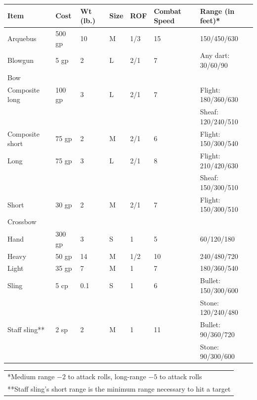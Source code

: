 \noindent
\begin{minipage}{\columnwidth}

\label{rangedweapons}
\noindent
\begin{tabular}{|p{}|p{}|p{}|p{}|p{}|p{}|p{}|}
\hline
Item				& Cost	& Wt (lb.)	& Size	& ROF	& Combat Speed	& Range (in feet)* \\
\hline\hline
\rowcolor[gray]{.9}Arquebus			& 500 gp	& 10		& M		& 1/3	& 15			& 150/450/630 \\
Blowgun				& 5 gp	& 2			& L		& 2/1	& 7				& Any dart: 30/60/90 \\
\rowcolor[gray]{.9}Bow					& 		& 			& 		& 		& 				& \\
\rowcolor[gray]{.9}\hspace{1em}Composite long 	& 100 gp	& 3			& L		& 2/1	& 7				& Flight: 180/360/630 \\
\rowcolor[gray]{.9}					& 		& 			& 		& 		& 				& Sheaf: 120/240/510 \\
\hspace{1em}Composite short	& 75 gp	& 2			& M		& 2/1	& 6				& Flight: 150/300/540 \\
\rowcolor[gray]{.9}\hspace{1em}Long				& 75 gp	& 3			& L		& 2/1	& 8				& Flight: 210/420/630 \\
\rowcolor[gray]{.9}					& 		& 			& 		& 		& 				& Sheaf: 150/300/510 \\
\hspace{1em}Short				& 30 gp	& 2			& M		& 2/1	& 7				& Flight: 150/300/510 \\
\rowcolor[gray]{.9}Crossbow			& 		& 			& 		& 		& 				& \\
\rowcolor[gray]{.9}\hspace{1em}Hand				& 300 gp	& 3			& S		& 1		&5				& 60/120/180 \\
\hspace{1em}Heavy				& 50 gp	& 14		& M		& 1/2	& 10			& 240/480/720 \\
\rowcolor[gray]{.9}\hspace{1em}Light				& 35 gp	& 7			& M		& 1		& 7				& 180/360/540 \\
Sling				& 5 cp	& 0.1		& S		& 1		& 6				& Bullet: 150/300/600 \\
					& 		& 			& 		& 		& 				& Stone: 120/240/480 \\
\rowcolor[gray]{.9}Staff sling**		& 2 sp	& 2			& M		& 1		& 11			& Bullet: 90/360/720 \\
\rowcolor[gray]{.9}					& 		& 			& 		& 		& 				& Stone: 90/300/600 \\
\hline
\end{tabular}
\noindent\begin{tabular}{p{}}
*Medium range $-2$ to attack rolls, long-range $-5$ to attack rolls \\
**Staff sling's short range is the minimum range necessary to hit a target \\
\end{tabular}\vspace{.5em}

\end{minipage}

